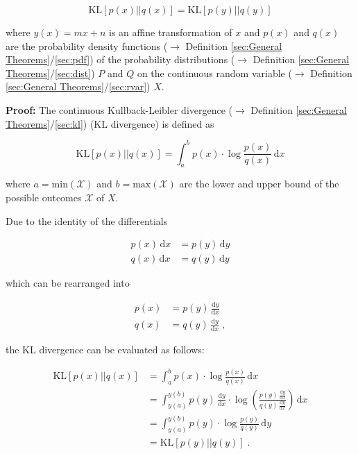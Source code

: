 \documentclass[a4paper,12pt,twoside]{book}
\begin{document}
\begin{equation} \label{eq:kl-inv-KL-inv}
\mathrm{KL}[p(x)||q(x)] = \mathrm{KL}[p(y)||q(y)]
\end{equation}

where $y(x) = mx + n$ is an affine transformation of $x$ and $p(x)$ and $q(x)$ are the probability density functions ($\rightarrow$ Definition \ref{sec:General Theorems}/\ref{sec:pdf}) of the probability distributions ($\rightarrow$ Definition \ref{sec:General Theorems}/\ref{sec:dist}) $P$ and $Q$ on the continuous random variable ($\rightarrow$ Definition \ref{sec:General Theorems}/\ref{sec:rvar}) $X$.


\vspace{1em}
\textbf{Proof:} The continuous Kullback-Leibler divergence ($\rightarrow$ Definition \ref{sec:General Theorems}/\ref{sec:kl}) (KL divergence) is defined as

\begin{equation} \label{eq:kl-inv-KL}
\mathrm{KL}[p(x)||q(x)] = \int_{a}^{b} p(x) \cdot \log \frac{p(x)}{q(x)} \, \mathrm{d}x
\end{equation}

where $a = \mathrm{min}(\mathcal{X})$ and $b = \mathrm{max}(\mathcal{X})$ are the lower and upper bound of the possible outcomes $\mathcal{X}$ of $X$.

Due to the identity of the differentials

\begin{equation} \label{eq:kl-inv-diff}
\begin{split}
p(x) \, \mathrm{d}x &= p(y) \, \mathrm{d}y \\
q(x) \, \mathrm{d}x &= q(y) \, \mathrm{d}y
\end{split}
\end{equation}

which can be rearranged into

\begin{equation} \label{eq:kl-inv-diff-dev}
\begin{split}
p(x) &= p(y) \, \frac{\mathrm{d}y}{\mathrm{d}x} \\
q(x) &= q(y) \, \frac{\mathrm{d}y}{\mathrm{d}x} \; ,
\end{split}
\end{equation}

the KL divergence can be evaluated as follows:

\begin{equation} \label{eq:kl-inv-MDE-DCE}
\begin{split}
\mathrm{KL}[p(x)||q(x)] &= \int_{a}^{b} p(x) \cdot \log \frac{p(x)}{q(x)} \, \mathrm{d}x \\
&= \int_{y(a)}^{y(b)} p(y) \, \frac{\mathrm{d}y}{\mathrm{d}x} \cdot \log \left( \frac{p(y) \, \frac{\mathrm{d}y}{\mathrm{d}x}}{q(y) \, \frac{\mathrm{d}y}{\mathrm{d}x}} \right) \, \mathrm{d}x \\
&= \int_{y(a)}^{y(b)} p(y) \cdot \log \frac{p(y)}{q(y)} \, \mathrm{d}y \\
&= \mathrm{KL}[p(y)||q(y)] \; .
\end{split}
\end{equation}
\end{document}
